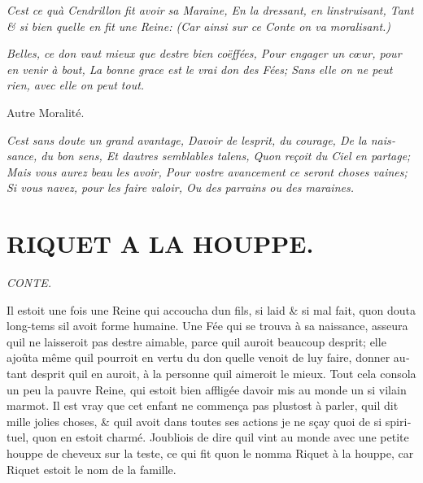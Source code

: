 \documentclass[14pt,a4paper]{memoir}
\begin{document}
\begin{otherlanguage}{french}
\emph{{C\textquotesingle est ce qu\textquotesingle à Cendrillon fit
avoir sa Maraine, } {En la dressant, en l\textquotesingle instruisant,}
{Tant \& si bien qu\textquotesingle elle en fit une Reine:} {(Car ainsi
sur ce Conte on va moralisant.)}}

\emph{{Belles, ce don vaut mieux que d\textquotesingle estre bien
coëffées,} {Pour engager un cœur, pour en venir à bout, } {La bonne
grace est le vrai don des Fées;} {Sans elle on ne peut rien, avec elle
on peut tout.}}

Autre Moralité.

\emph{{C\textquotesingle est sans doute un grand avantage,}
{D\textquotesingle avoir de l\textquotesingle esprit, du courage,} {De
la naissance, du bon sens,} {Et d\textquotesingle autres semblables
talens,} {Qu\textquotesingle on reçoit du Ciel en partage;} {Mais vous
aurez beau les avoir,} {Pour vostre avancement ce seront choses vaines;
} {Si vous n\textquotesingle avez, pour les faire valoir,} {Ou des
parrains ou des maraines.}}

\section{RIQUET A LA HOUPPE.}

\emph{CONTE.}

Il estoit une fois une Reine qui accoucha d\textquotesingle un fils, si
laid \& si mal fait, qu\textquotesingle on douta long-tems
s\textquotesingle il avoit forme humaine. Une Fée qui se trouva à sa
naissance, asseura qu\textquotesingle il ne laisseroit pas
d\textquotesingle estre aimable, parce qu\textquotesingle il auroit
beaucoup d\textquotesingle esprit; elle ajoûta même
qu\textquotesingle il pourroit en vertu du don qu\textquotesingle elle
venoit de luy faire, donner autant d\textquotesingle esprit
qu\textquotesingle il en auroit, à la personne qu\textquotesingle il
aimeroit le mieux. Tout cela consola un peu la pauvre Reine, qui estoit
bien affligée d\textquotesingle avoir mis au monde un si vilain marmot.
Il est vray que cet enfant ne commença pas plustost à parler,
qu\textquotesingle il dit mille jolies choses, \& qu\textquotesingle il
avoit dans toutes ses actions je ne sçay quoi de si spirituel,
qu\textquotesingle on en estoit charmé. J\textquotesingle oubliois de
dire qu\textquotesingle il vint au monde avec une petite houppe de
cheveux sur la teste, ce qui fit qu\textquotesingle on le nomma Riquet à
la houppe, car Riquet estoit le nom de la famille.


\end{otherlanguage}
\end{document}

